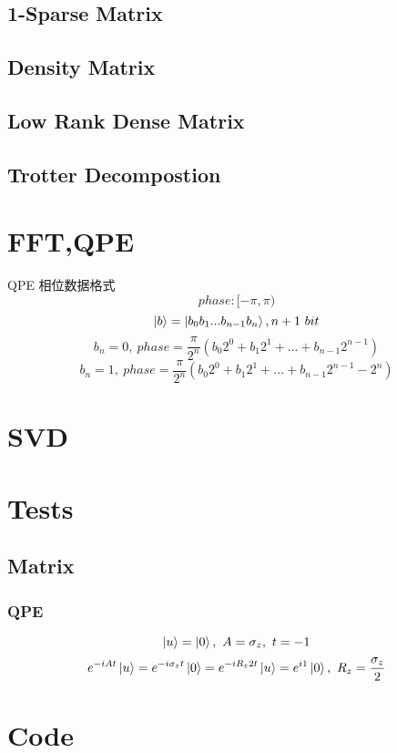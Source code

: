 \documentclass{article}
\begin{document}
\subsection{1-Sparse Matrix}
\subsection{Density Matrix}
\subsection{Low Rank Dense Matrix}
\subsection{Trotter Decompostion}

\section{FFT,QPE}
QPE 相位数据格式
	$$phase:[-\pi,\pi)$$
	$$ \ket{b} = \ket{b_0b_1...b_{n-1}b_n}, n+1\ bit$$
	$$b_n =0,	\  phase= \frac{\pi}{2^{n}} (b_0 2^0 + b_1 2^1+ ... + b_{n-1} 2^{n-1})  $$
    $$b_n =1,	\  phase= \frac{\pi}{2^{n}} (b_0 2^0 + b_1 2^1+ ... + b_{n-1} 2^{n-1}-2^{n})  $$

\section{SVD}
\section{Tests}
\subsection{Matrix}
\subsubsection{QPE}
	$$ \ket{u} = \ket{0}, \  A=\sigma_z, \ t= -1 $$
	$$ e^{-iAt} \ket{u} = e^{-i \sigma_z t} \ket{0} = e^{-iR_z 2t} \ket{u} = e^{i 1} \ket{0}, \ R_z = \frac{\sigma_z}{2} $$
\section{Code}
\end{document}
